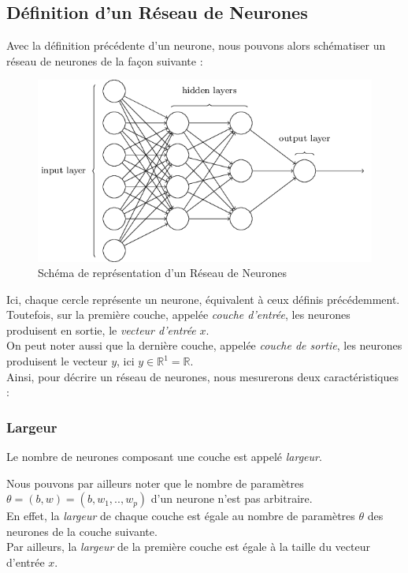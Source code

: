 \documentclass[10pt,a4paper]{report}
\begin{document}
		\subsection{Définition d'un Réseau de Neurones}
		Avec la définition précédente d'un neurone, nous pouvons alors schématiser un réseau de neurones de la façon suivante :
		\begin{figure}[H]
			\begin{center}
				\includegraphics[scale=0.5]{Images/neuralnetwork.png}
				\caption{Schéma de représentation d'un Réseau de Neurones}
			\end{center}
		\end{figure}
		Ici, chaque cercle représente un neurone, équivalent à ceux définis précédemment.\\
		Toutefois, sur la première couche, appelée \emph{couche d'entrée}, les neurones produisent en sortie, le \emph{vecteur d'entrée} $x$.\\
		On peut noter aussi que la dernière couche, appelée \emph{couche de sortie}, les neurones produisent le vecteur $y$, ici $y\in \mathbb{R}^1 = \mathbb{R}$.\\
		Ainsi, pour décrire un réseau de neurones, nous mesurerons deux caractéristiques :
		\subsubsection{Largeur}
		\begin{center}
			Le nombre de neurones composant une couche est appelé \emph{largeur}.\\
		\end{center}
		Nous pouvons par ailleurs noter que le nombre de paramètres $\theta = (b,w) = (b,w_1,..,w_p)$ d'un neurone n'est pas arbitraire.\\
		En effet, la \emph{largeur} de chaque couche est égale au nombre de paramètres $\theta$ des neurones de la couche suivante.\\
		Par ailleurs, la \emph{largeur} de la première couche est égale à la taille du vecteur d'entrée $x$.\\
		
\end{document}

